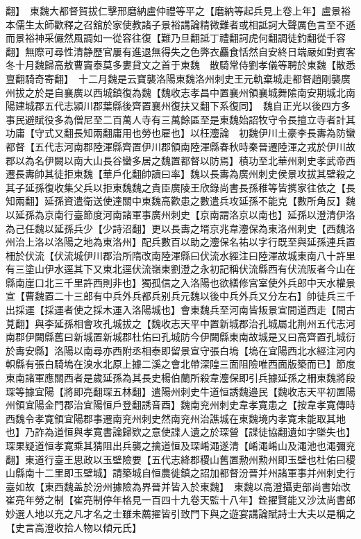 翻】　東魏大都督賀拔仁擊邢磨納盧仲禮等平之【磨納等起兵見上卷上年】盧景裕本儒生太師歡釋之召舘於家使教諸子景裕講論精微難者或相詆訶大聲厲色言至不遜而景裕神采儼然風調如一從容往復【難乃旦翻詆丁禮翻訶虎何翻調徒釣翻從千容翻】無際可尋性清静歷官屢有進退無得失之色弊衣麤食恬然自安終日端嚴如對賓客　冬十月魏歸高敖曹竇泰莫多婁貸文之首于東魏　散騎常侍劉孝儀等聘於東魏【散悉亶翻騎奇寄翻】　十二月魏是云寶襲洛陽東魏洛州刺史王元軌棄城走都督趙剛襲廣州拔之於是自襄廣以西城鎮復為魏【魏收志孝昌中置襄州領襄城舞隂南安期城北南陽建城郡五代志潁川郡葉縣後齊置襄州復扶又翻下系復同】　魏自正光以後四方多事民避賦役多為僧尼至二百萬人寺有三萬餘區至是東魏始詔牧守令長擅立寺者計其功庸【守式又翻長知兩翻庸用也勞也雇也】以枉灋論　初魏伊川土豪李長夀為防蠻都督【五代志河南郡陸渾縣齊置伊川郡領南陸渾縣春秋時秦晉遷陸渾之戎於伊川故郡以為名伊闕以南大山長谷蠻多居之魏置都督以防焉】積功至北華州刺史孝武帝西遷長夀帥其徒拒東魏【華戶化翻帥讀曰率】魏以長夀為廣州刺史侯景攻拔其壁殺之其子延孫復收集父兵以拒東魏魏之貴臣廣陵王欣錄尚書長孫稚等皆㩗家往依之【長知兩翻】延孫資遣衛送使達關中東魏高歡患之數遣兵攻延孫不能克【數所角反】魏以延孫為京南行臺節度河南諸軍事廣州刺史【京南謂洛京以南也】延孫以澄清伊洛為己任魏以延孫兵少【少詩沼翻】更以長夀之壻京兆韋灋保為東洛州刺史【西魏洛州治上洛以洛陽之地為東洛州】配兵數百以助之灋保名祐以字行既至與延孫連兵置柵於伏流【伏流城伊川郡治所隋改南陸渾縣曰伏流水經注曰陸渾故城東南八十許里有三塗山伊水逕其下又東北逕伏流嶺東劉澄之永初記稱伏流縣西有伏流阪者今山在縣南崖口北三千里許西則非也】獨孤信之入洛陽也欲繕修宫室使外兵郎中天水權景宣【曹魏置二十三郎有中兵外兵都兵别兵元魏以後中兵外兵又分左右】帥徒兵三千出採運【採運者使之採木運入洛陽城也】會東魏兵至河南皆叛景宣間道西走【間古莧翻】與李延孫相會攻孔城拔之【魏收志天平中置新城郡治孔城屬北荆州五代志河南郡伊闕縣舊曰新城置新城郡杜佑曰孔城防今伊闕縣東南故城是又曰高齊置孔城衍於夀安縣】洛陽以南尋亦西附丞相泰即留景宣守張白塢【塢在宜陽西北水經注河内軹縣有張白騎塢在溴水北原上據二溪之會北帶深隍三面阻險唯西面版築而已】節度東南諸軍應關西者是歲延孫為其長史楊伯蘭所殺韋灋保即引兵據延孫之柵東魏將段琛等據宜陽【將即亮翻琛五林翻】遣陽州刺史牛道恒誘魏邉民【魏收志天平初置陽州領宜陽金門郡治宜陽恒戶登翻誘音酉】魏南兖州刺史韋孝寛患之【按韋孝寛傳時西魏令孝寛領宜陽郡事遷南兖州刺史然南兖州治譙城在東魏境内孝寛未能取其地也】乃詐為道恒與孝寛書論歸欵之意使諜人遺之於琛營【諜徒協翻遺如字墜失也】琛果疑道恒孝寛乘其猜阻出兵襲之擒道恒及琛崤澠遂清【崤澠崤山及澠池也澠彌兖翻】東道行臺王思政以玉壁險要【五代志絳郡稷山舊置勲州勲州即玉壁也杜佑曰稷山縣南十二里即玉壁城】請築城自恒農徙鎮之詔加都督汾晉并州諸軍事并州刺史行臺如故【東西魏盖於汾州據險為界晉并皆入於東魏】　東魏以高澄攝吏部尚書始改崔亮年勞之制【崔亮制停年格見一百四十九卷天監十八年】銓擢賢能又沙汰尚書郎妙選人地以充之凡才名之士雖未薦擢皆引致門下與之遊宴講論賦詩士大夫以是稱之【史言高澄收拾人物以傾元氏】

